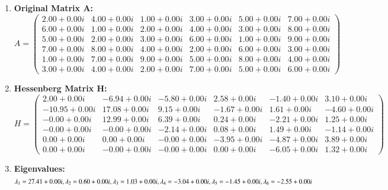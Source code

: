 \documentclass[journal,12pt,onecolumn]{IEEEtran}
\theoremstyle{remark}
\begin{document}
\begin{enumerate}
	\item \textbf{Original Matrix A:}
	\[
	A = \begin{pmatrix}
		2.00 + 0.00i & 4.00 + 0.00i & 1.00 + 0.00i & 3.00 + 0.00i & 5.00 + 0.00i & 7.00 + 0.00i \\
		6.00 + 0.00i & 1.00 + 0.00i & 2.00 + 0.00i & 4.00 + 0.00i & 3.00 + 0.00i & 8.00 + 0.00i \\
		5.00 + 0.00i & 2.00 + 0.00i & 3.00 + 0.00i & 6.00 + 0.00i & 1.00 + 0.00i & 9.00 + 0.00i \\
		7.00 + 0.00i & 8.00 + 0.00i & 4.00 + 0.00i & 2.00 + 0.00i & 6.00 + 0.00i & 3.00 + 0.00i \\
		1.00 + 0.00i & 7.00 + 0.00i & 9.00 + 0.00i & 5.00 + 0.00i & 8.00 + 0.00i & 4.00 + 0.00i \\
		3.00 + 0.00i & 4.00 + 0.00i & 2.00 + 0.00i & 7.00 + 0.00i & 5.00 + 0.00i & 6.00 + 0.00i
	\end{pmatrix}
	\]
	
	\item \textbf{Hessenberg Matrix H:}
	\[
	H = \begin{pmatrix}
		2.00 + 0.00i & -6.94 + 0.00i & -5.80 + 0.00i & 2.58 + 0.00i & -1.40 + 0.00i & 3.10 + 0.00i \\
		-10.95 + 0.00i & 17.08 + 0.00i & 9.15 + 0.00i & -1.67 + 0.00i & 1.61 + 0.00i & -4.60 + 0.00i \\
		-0.00 + 0.00i & 12.99 + 0.00i & 6.39 + 0.00i & 0.24 + 0.00i & -2.21 + 0.00i & 1.25 + 0.00i \\
		-0.00 + 0.00i & -0.00 + 0.00i & -2.14 + 0.00i & 0.08 + 0.00i & 1.49 + 0.00i & -1.14 + 0.00i \\
		0.00 + 0.00i & 0.00 + 0.00i & -0.00 + 0.00i & -3.95 + 0.00i & -4.87 + 0.00i & 3.89 + 0.00i \\
		0.00 + 0.00i & -0.00 + 0.00i & -0.00 + 0.00i & 0.00 + 0.00i & -6.05 + 0.00i & 1.32 + 0.00i
	\end{pmatrix}
	\]
	
	\item \textbf{Eigenvalues:}
	\[
	\lambda_1 = 27.41 + 0.00i, \\
	\lambda_2 = 0.60 + 0.00i, \\
	\lambda_3 = 1.03 + 0.00i, \\
	\lambda_4 = -3.04 + 0.00i, \\
	\lambda_5 = -1.45 + 0.00i, \\
	\lambda_6 = -2.55 + 0.00i
	\]
\end{enumerate}
\end{document}
